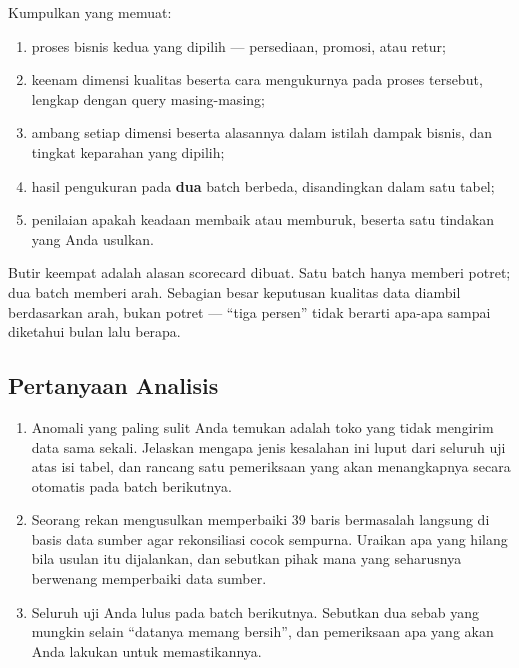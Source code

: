 Kumpulkan  yang memuat:

\begin{enumerate}[leftmargin=1.4em]
  \item proses bisnis kedua yang dipilih --- persediaan, promosi, atau retur;
  \item keenam dimensi kualitas beserta cara mengukurnya pada proses tersebut,
        lengkap dengan query masing-masing;
  \item ambang setiap dimensi beserta alasannya dalam istilah dampak bisnis,
        dan tingkat keparahan yang dipilih;
  \item hasil pengukuran pada \textbf{dua} batch berbeda, disandingkan dalam
        satu tabel;
  \item penilaian apakah keadaan membaik atau memburuk, beserta satu tindakan
        yang Anda usulkan.
\end{enumerate}

\begin{catatan}
Butir keempat adalah alasan scorecard dibuat. Satu batch hanya memberi potret;
dua batch memberi arah. Sebagian besar keputusan kualitas data diambil
berdasarkan arah, bukan potret --- ``tiga persen'' tidak berarti apa-apa
sampai diketahui bulan lalu berapa.
\end{catatan}

\subsection{Pertanyaan Analisis}

\begin{enumerate}[leftmargin=1.4em]
  \item Anomali yang paling sulit Anda temukan adalah toko yang tidak mengirim
        data sama sekali. Jelaskan mengapa jenis kesalahan ini luput dari
        seluruh uji atas isi tabel, dan rancang satu pemeriksaan yang akan
        menangkapnya secara otomatis pada batch berikutnya.
  \item Seorang rekan mengusulkan memperbaiki 39 baris bermasalah langsung di
        basis data sumber agar rekonsiliasi cocok sempurna. Uraikan apa yang
        hilang bila usulan itu dijalankan, dan sebutkan pihak mana yang
        seharusnya berwenang memperbaiki data sumber.
  \item Seluruh uji Anda lulus pada batch berikutnya. Sebutkan dua sebab yang
        mungkin selain ``datanya memang bersih'', dan pemeriksaan apa yang akan
        Anda lakukan untuk memastikannya.
\end{enumerate}

